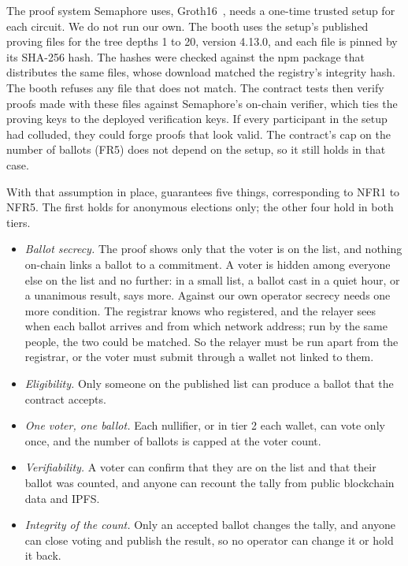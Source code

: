 The proof system Semaphore uses, Groth16~\cite{groth16}, needs a one-time
trusted setup for each circuit. We do not run our own. The booth uses the
setup's published proving files for the tree depths 1 to 20, version 4.13.0,
and each file is pinned by its SHA-256 hash. The hashes were checked against
the npm package that distributes the same files, whose download matched the
registry's integrity hash. The booth refuses any file that does not match. The
contract tests then verify proofs made with these files against Semaphore's
on-chain verifier, which ties the proving keys to the deployed verification
keys. If every participant in the setup had colluded, they could forge proofs
that look valid. The contract's cap on the number of ballots (FR5) does not
depend on the setup, so it still holds in that case.

With that assumption in place, \projectname{} guarantees five things,
corresponding to NFR1 to NFR5. The first holds for anonymous elections only;
the other four hold in both tiers.

\begin{itemize}
  \item \emph{Ballot secrecy.} The proof shows only that the voter is on the
        list, and nothing on-chain links a ballot to a commitment. A voter is
        hidden among everyone else on the list and no further: in a small
        list, a ballot cast in a quiet hour, or a unanimous result, says more.
        Against our own operator secrecy needs one more condition. The
        registrar knows who registered, and the relayer sees when each ballot
        arrives and from which network address; run by the same people, the
        two could be matched. So the relayer must be run apart from the
        registrar, or the voter must submit through a wallet not linked to
        them.
  \item \emph{Eligibility.} Only someone on the published list can produce a
        ballot that the contract accepts.
  \item \emph{One voter, one ballot.} Each nullifier, or in tier 2 each
        wallet, can vote only once, and the number of ballots is capped at the
        voter count.
  \item \emph{Verifiability.} A voter can confirm that they are on the list
        and that their ballot was counted, and anyone can recount the tally
        from public blockchain data and IPFS.
  \item \emph{Integrity of the count.} Only an accepted ballot changes the
        tally, and anyone can close voting and publish the result, so no
        operator can change it or hold it back.
\end{itemize}

